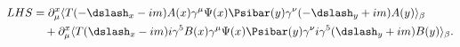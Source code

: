 \begin{equation*}
\begin{split}
  LHS&=\partial^x_\mu \langle T (-\dslash_x-im)A(x)\gamma^\mu\Psi(x)
       \Psibar(y)\gamma^\nu(-\dslash_y+im)A(y)\rangle_\beta\\ 
       &\quad +\partial^x_\mu \langle T (\dslash_x-im)i\gamma^5B(x)
       \gamma^\mu\Psi(x)\Psibar(y)\gamma^\nu 
       i\gamma^5(\dslash_y+im)B(y)\rangle_\beta.\\
\end{split}
\end{equation*}

